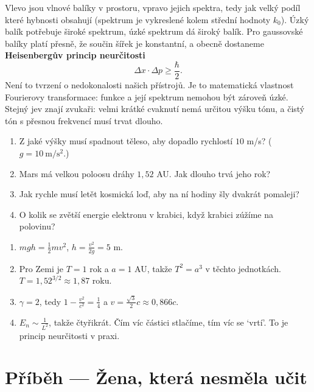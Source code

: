 Vlevo jsou vlnové balíky v prostoru, vpravo jejich spektra, tedy jak velký podíl které hybnosti obsahují (spektrum je vykreslené kolem střední hodnoty $k_0$). Úzký balík potřebuje široké spektrum, úzké spektrum dá široký balík. Pro gaussovské balíky platí přesně, že součin šířek je konstantní, a obecně dostaneme \textbf{Heisenbergův princip neurčitosti}
\begin{equation*}
  \Delta x\cdot\Delta p\geq\frac{\hbar}{2}.
\end{equation*}
Není to tvrzení o nedokonalosti našich přístrojů. Je to matematická vlastnost Fourierovy transformace: funkce a její spektrum nemohou být zároveň úzké. Stejný jev znají zvukaři: velmi krátké cvaknutí nemá určitou výšku tónu, a čistý tón s přesnou frekvencí musí trvat dlouho.

\begin{problem}
  \begin{enumerate}[label=(\alph*)]
    \item Z jaké výšky musí spadnout těleso, aby dopadlo rychlostí $10$ m/s? ($g = 10\ \mathrm{m/s^2}$.)
    \item Mars má velkou poloosu dráhy $1{,}52$ AU. Jak dlouho trvá jeho rok?
    \item Jak rychle musí letět kosmická loď, aby na ní hodiny šly dvakrát pomaleji?
    \item O kolik se zvětší energie elektronu v krabici, když krabici zúžíme na polovinu?
  \end{enumerate}
\end{problem}

\begin{solution}
  \begin{enumerate}[label=(\alph*)]
    \item $mgh = \frac{1}{2}mv^2$, $h = \frac{v^2}{2g} = 5$ m.
    \item Pro Zemi je $T = 1$ rok a $a = 1$ AU, takže $T^2 = a^3$ v těchto jednotkách. $T = 1{,}52^{3/2}\approx 1{,}87$ roku.
    \item $\gamma = 2$, tedy $1 - \frac{v^2}{c^2} = \frac{1}{4}$ a $v = \frac{\sqrt{3}}{2}c\approx 0{,}866c$.
    \item $E_n\sim\frac{1}{L^2}$, takže čtyřikrát. Čím víc částici stlačíme, tím víc se `vrtí'. To je princip neurčitosti v praxi.
  \end{enumerate}
\end{solution}

\section{Příběh --- Žena, která nesměla učit}

